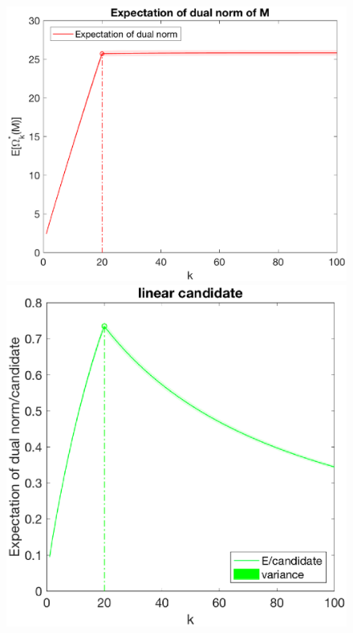 \documentclass[12pt]{article}
\begin{document}
\begin{figure}[h]
    \begin{minipage}[c]{.3\linewidth}
        \centering
        \includegraphics[width=\linewidth]{Fig/dualnorm-u0ones-k0-20.eps}
    \end{minipage}
    \hfill%
    \begin{minipage}[c]{.3\linewidth}
        \centering
        \includegraphics[width=\linewidth]{Fig/dualnorm-u0ones-k0-20-candidatelin.eps}

\end{minipage}
\end{figure}
\end{document}
